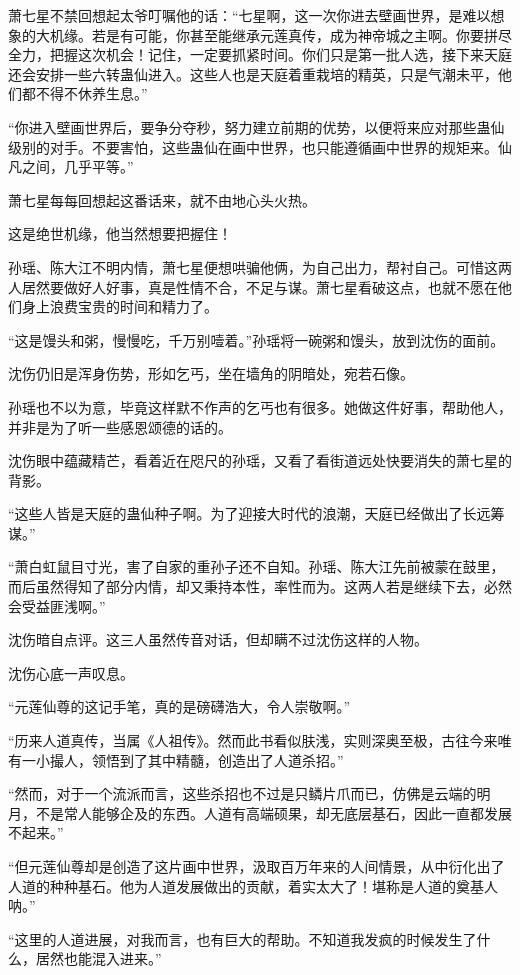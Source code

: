 \begin{this_body}
萧七星不禁回想起太爷叮嘱他的话：“七星啊，这一次你进去壁画世界，是难以想象的大机缘。若是有可能，你甚至能继承元莲真传，成为神帝城之主啊。你要拼尽全力，把握这次机会！记住，一定要抓紧时间。你们只是第一批人选，接下来天庭还会安排一些六转蛊仙进入。这些人也是天庭着重栽培的精英，只是气潮未平，他们都不得不休养生息。”

“你进入壁画世界后，要争分夺秒，努力建立前期的优势，以便将来应对那些蛊仙级别的对手。不要害怕，这些蛊仙在画中世界，也只能遵循画中世界的规矩来。仙凡之间，几乎平等。”

萧七星每每回想起这番话来，就不由地心头火热。

这是绝世机缘，他当然想要把握住！

孙瑶、陈大江不明内情，萧七星便想哄骗他俩，为自己出力，帮衬自己。可惜这两人居然要做好人好事，真是性情不合，不足与谋。萧七星看破这点，也就不愿在他们身上浪费宝贵的时间和精力了。

“这是馒头和粥，慢慢吃，千万别噎着。”孙瑶将一碗粥和馒头，放到沈伤的面前。

沈伤仍旧是浑身伤势，形如乞丐，坐在墙角的阴暗处，宛若石像。

孙瑶也不以为意，毕竟这样默不作声的乞丐也有很多。她做这件好事，帮助他人，并非是为了听一些感恩颂德的话的。

沈伤眼中蕴藏精芒，看着近在咫尺的孙瑶，又看了看街道远处快要消失的萧七星的背影。

“这些人皆是天庭的蛊仙种子啊。为了迎接大时代的浪潮，天庭已经做出了长远筹谋。”

“萧白虹鼠目寸光，害了自家的重孙子还不自知。孙瑶、陈大江先前被蒙在鼓里，而后虽然得知了部分内情，却又秉持本性，率性而为。这两人若是继续下去，必然会受益匪浅啊。”

沈伤暗自点评。这三人虽然传音对话，但却瞒不过沈伤这样的人物。

沈伤心底一声叹息。

“元莲仙尊的这记手笔，真的是磅礴浩大，令人崇敬啊。”

“历来人道真传，当属《人祖传》。然而此书看似肤浅，实则深奥至极，古往今来唯有一小撮人，领悟到了其中精髓，创造出了人道杀招。”

“然而，对于一个流派而言，这些杀招也不过是只鳞片爪而已，仿佛是云端的明月，不是常人能够企及的东西。人道有高端硕果，却无底层基石，因此一直都发展不起来。”

“但元莲仙尊却是创造了这片画中世界，汲取百万年来的人间情景，从中衍化出了人道的种种基石。他为人道发展做出的贡献，着实太大了！堪称是人道的奠基人呐。”

“这里的人道进展，对我而言，也有巨大的帮助。不知道我发疯的时候发生了什么，居然也能混入进来。”


\end{this_body}
